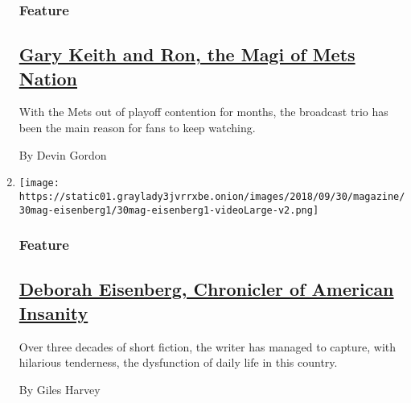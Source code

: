 \begin{enumerate}
  \hypertarget{feature-2}{%
  \subsubsection{Feature}\label{feature-2}}

  \hypertarget{gary-keith-and-ron-the-magi-of-mets-nation}{%
  \subsection{\texorpdfstring{\href{/2018/09/25/magazine/mets-baseball-gary-keith-ron.html}{Gary
  Keith and Ron, the Magi of Mets
  Nation}}{Gary Keith and Ron, the Magi of Mets Nation}}\label{gary-keith-and-ron-the-magi-of-mets-nation}}

  With the Mets out of playoff contention for months, the broadcast trio
  has been the main reason for fans to keep watching.

  By Devin Gordon
\item
  \texttt{[image: https://static01.graylady3jvrrxbe.onion/images/2018/09/30/magazine/30mag-eisenberg1/30mag-eisenberg1-videoLarge-v2.png]}

  \hypertarget{feature-3}{%
  \subsubsection{Feature}\label{feature-3}}

  \hypertarget{deborah-eisenberg-chronicler-of-american-insanity}{%
  \subsection{\texorpdfstring{\href{/2018/09/27/magazine/deborah-eisenberg-chronicler-of-american-insanity.html}{Deborah
  Eisenberg, Chronicler of American
  Insanity}}{Deborah Eisenberg, Chronicler of American Insanity}}\label{deborah-eisenberg-chronicler-of-american-insanity}}

  Over three decades of short fiction, the writer has managed to
  capture, with hilarious tenderness, the dysfunction of daily life in
  this country.

  By Giles Harvey
\end{enumerate}

